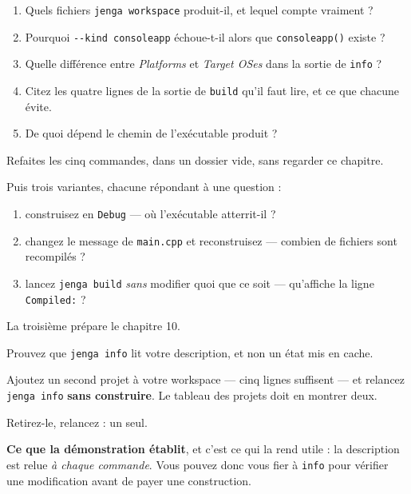 \begin{nkquestions}
\begin{enumerate}
\item Quels fichiers \texttt{jenga workspace} produit-il, et lequel compte
      vraiment ?
\item Pourquoi \texttt{-{}-kind consoleapp} échoue-t-il alors que
      \texttt{consoleapp()} existe ?
\item Quelle différence entre \emph{Platforms} et \emph{Target OSes} dans la
      sortie de \texttt{info} ?
\item Citez les quatre lignes de la sortie de \texttt{build} qu'il faut lire, et
      ce que chacune évite.
\item De quoi dépend le chemin de l'exécutable produit ?
\end{enumerate}
\end{nkquestions}

\begin{nkpratique}
Refaites les cinq commandes, dans un dossier vide, sans regarder ce chapitre.

Puis trois variantes, chacune répondant à une question :
\begin{enumerate}
\item construisez en \texttt{Debug} --- où l'exécutable atterrit-il ?
\item changez le message de \texttt{main.cpp} et reconstruisez --- combien de
      fichiers sont recompilés ?
\item lancez \texttt{jenga build} \emph{sans} modifier quoi que ce soit ---
      qu'affiche la ligne \texttt{Compiled:} ?
\end{enumerate}
La troisième prépare le chapitre 10.
\end{nkpratique}

\begin{nkdemo}
Prouvez que \texttt{jenga info} lit votre description, et non un état mis en
cache.

Ajoutez un second projet à votre workspace --- cinq lignes suffisent --- et
relancez \texttt{jenga info} \textbf{sans construire}. Le tableau des projets
doit en montrer deux.

Retirez-le, relancez : un seul.

\textbf{Ce que la démonstration établit}, et c'est ce qui la rend utile : la
description est relue \emph{à chaque commande}. Vous pouvez donc vous fier à
\texttt{info} pour vérifier une modification avant de payer une construction.
\end{nkdemo}

